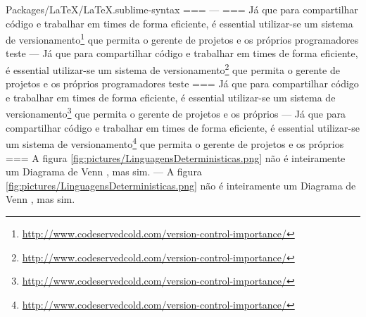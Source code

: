 Packages/LaTeX/LaTeX.sublime-syntax
===
---
===
Já que para compartilhar código e trabalhar em times de forma eficiente, é essential
utilizar\hyp{}se um sistema de
versionamento\footnote{\url{http://www.codeservedcold.com/version-control-importance/}} que permita
o gerente de projetos e os próprios programadores teste
---
Já que para compartilhar código e
trabalhar em times de forma eficiente,
é essential utilizar\hyp{}se um sistema de
versionamento\footnote{\url{http://www.codeservedcold.com/version-control-importance/}}
que permita o gerente de projetos e
os próprios programadores teste
===
Já que para compartilhar código e trabalhar em times de forma eficiente, é essential
utilizar\hyp{}se um sistema de
versionamento\footnote{\url{http://www.codeservedcold.com/version-control-importance/}} que permita
o gerente de projetos e os próprios
---
Já que para compartilhar código e
trabalhar em times de forma eficiente,
é essential utilizar\hyp{}se um sistema de
versionamento\footnote{\url{http://www.codeservedcold.com/version-control-importance/}} que
permita o gerente de projetos e os próprios
===
    A figura \ref{fig:pictures/LinguagensDeterministicas.png} não é
    inteiramente um Diagrama de Venn \cite{generalizedVennDiagrams}, mas sim.
---
    A figura \ref{fig:pictures/LinguagensDeterministicas.png} não é
    inteiramente um Diagrama de Venn \cite{generalizedVennDiagrams},
    mas sim.
